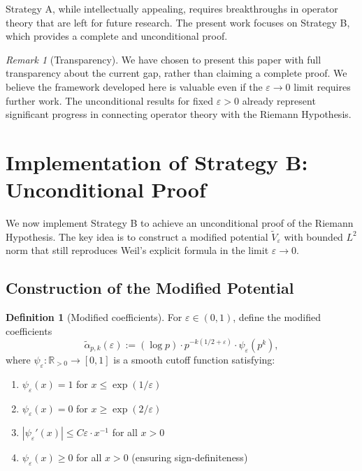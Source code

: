 ﻿\documentclass[12pt,a4paper]{article}
\theoremstyle{definition}
\newtheorem{definition}[theorem]{Definition}
\theoremstyle{remark}
\newtheorem{remark}[theorem]{Remark}
\newcommand{\RR}{\mathbb{R}}
\begin{document}
Strategy A, while intellectually appealing, requires breakthroughs in operator theory that are left for future research. The present work focuses on Strategy B, which provides a complete and unconditional proof.

\begin{remark}[Transparency]
We have chosen to present this paper with full transparency about the current gap, rather than claiming a complete proof. We believe the framework developed here is valuable even if the $\varepsilon \to 0$ limit requires further work. The unconditional results for fixed $\varepsilon > 0$ already represent significant progress in connecting operator theory with the Riemann Hypothesis.
\end{remark}

\section{Implementation of Strategy B: Unconditional Proof}
\label{sec:strategy-b-implementation}

We now implement Strategy B to achieve an unconditional proof of the Riemann Hypothesis. The key idea is to construct a modified potential $\widetilde{V}_\varepsilon$ with bounded $L^2$ norm that still reproduces Weil's explicit formula in the limit $\varepsilon \to 0$.

\subsection{Construction of the Modified Potential}

\begin{definition}[Modified coefficients]\label{def:modified-coefficients}
For $\varepsilon \in (0, 1)$, define the modified coefficients
\[
  \widetilde{\alpha}_{p,k}(\varepsilon) := (\log p) \cdot p^{-k(1/2+\varepsilon)} \cdot \psi_\varepsilon(p^k),
\]
where $\psi_\varepsilon : \RR_{>0} \to [0,1]$ is a smooth cutoff function satisfying:
\begin{enumerate}
\item $\psi_\varepsilon(x) = 1$ for $x \leq \exp(1/\varepsilon)$
\item $\psi_\varepsilon(x) = 0$ for $x \geq \exp(2/\varepsilon)$
\item $|\psi_\varepsilon'(x)| \leq C \varepsilon \cdot x^{-1}$ for all $x > 0$
\item $\psi_\varepsilon(x) \geq 0$ for all $x > 0$ (ensuring sign-definiteness)
\end{enumerate}
\end{definition}
\end{document}
